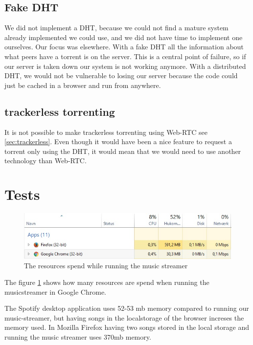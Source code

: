 \subsection{Fake \acs{DHT}}
We did not implement a DHT, because we could not find a mature system already implemented we could use, and we did not have time to implement one ourselves.
Our focus was elsewhere.
With a fake \acs{DHT} all the information about what peers have a torrent is on the server. This is a central point of failure, so if our server is taken down our system is not working anymore.
With a distributed \acs{DHT}, we would not be vulnerable to losing our server because the code could just be cached in a browser and run from anywhere.
\subsection{trackerless torrenting}
It is not possible to make trackerless torrenting using Web-RTC see \ref{sec:trackerless}. Even though it would have been a nice feature to request a torrent only using the \acs{DHT}, it would mean that we would need to use another technology than Web-RTC. 

\section{Tests}
\begin{figure}[H]
	\centering
	\includegraphics[scale=0.8]{gfx/streamerIdle}
	\caption{The resources spend while running the music streamer}
	\label{fig:streamer-idle}
\end{figure}
The figure \ref{fig:streamer-idle} shows how many resources are spend when running the musicstreamer in Google Chrome.

The Spotify desktop application uses 52-53 mb memory compared to running our music-streamer, but having songs in the localstorage of the browser increses the memory used. In Mozilla Firefox having two songs stored in the local storage and running the music streamer uses 370mb memory.

